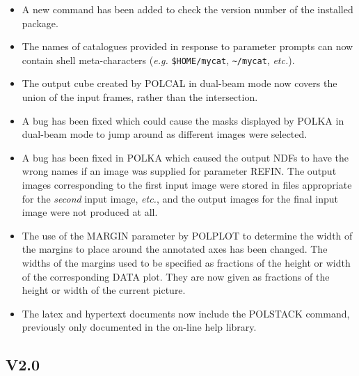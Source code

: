 \documentclass[twoside,11pt]{starlink}
\begin{document}
\begin{itemize}

\item A new command  has been added to check
the version number of the installed package.

\item The names of catalogues provided in response to parameter prompts
can now contain shell meta-characters (\emph{e.g.} \verb+$HOME/mycat+,
\verb+~/mycat+, \emph{etc.}).

\item The output cube created by POLCAL in dual-beam mode now covers the
union of the input frames, rather than the intersection.

\item A bug has been fixed which could cause the masks displayed by POLKA
in dual-beam mode to jump around as different images were selected.

\item A bug has been fixed in POLKA which caused the output NDFs to have
the wrong names if an image was supplied for parameter REFIN. The output
images corresponding to the first input image were stored in files
appropriate for the \emph{second} input image, \emph{etc.}, and the
output images for the final input image were not produced at all.

\item The use of the MARGIN parameter by POLPLOT to determine the width of
the margins to place around the annotated axes has been changed. The widths
of the margins used to be specified as fractions of the height or width
of the corresponding DATA plot. They are now given as fractions of the
height or width of the current picture.

\item The latex and hypertext documents now include the POLSTACK command,
previously only documented in the on-line help library.

\end{itemize}

\subsection{V2.0}
\end{document}
